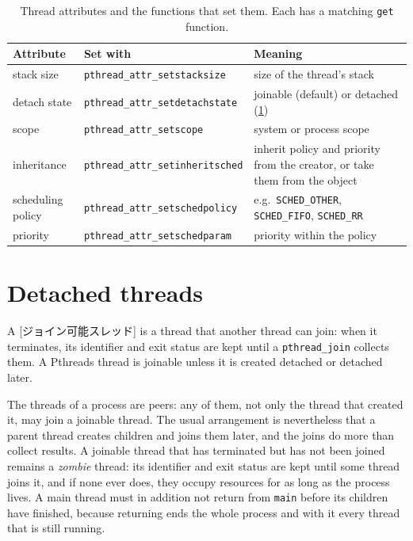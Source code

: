 \documentclass[../main.tex]{subfiles}
\begin{document}
\begin{table}[htbp]
  \centering
  \caption{Thread attributes and the functions that set them.  Each has a
    matching \texttt{get} function.}
  \label{tab:l04-attributes}
  \small
  \begin{tabular}{@{}>{\RaggedRight}p{18mm}l>{\RaggedRight\arraybackslash}p{42mm}@{}}
    \toprule
    Attribute & Set with & Meaning \\
    \midrule
    stack size   & \texttt{pthread\_attr\_setstacksize}
                 & size of the thread's stack \\
    detach state & \texttt{pthread\_attr\_setdetachstate}
                 & joinable (default) or detached (\cref{sec:l04-detached}) \\
    scope        & \texttt{pthread\_attr\_setscope}
                 & system or process scope \\
    inheritance  & \texttt{pthread\_attr\_setinheritsched}
                 & inherit policy and priority from the creator, or take
                   them from the object \\
    scheduling policy & \texttt{pthread\_attr\_setschedpolicy}
                 & e.g.\ \texttt{SCHED\_OTHER}, \texttt{SCHED\_FIFO},
                   \texttt{SCHED\_RR} \\
    priority     & \texttt{pthread\_attr\_setschedparam}
                 & priority within the policy \\
    \bottomrule
  \end{tabular}
\end{table}

\section{Detached threads}
\label{sec:l04-detached}

\begin{definition}
  A [ジョイン可能スレッド] is a thread that another
  thread can join: when it terminates, its identifier and exit status are
  kept until a \texttt{pthread\_join} collects them.  A Pthreads thread is
  joinable unless it is created detached or detached later.
\end{definition}

The threads of a process are peers: any of them, not only the thread that
created it, may join a joinable thread.  The usual arrangement is nevertheless that a parent
thread creates children and joins them later, and the joins do more than
collect results.  A joinable thread that has terminated but has not been
joined remains a \emph{zombie} thread: its identifier and exit status are
kept until some thread joins it, and if none ever does, they occupy
resources for as long as the process lives.  A main thread must in addition
not return from \texttt{main} before its children have finished, because
returning ends the whole process and with it every thread that is still
running.
\end{document}
